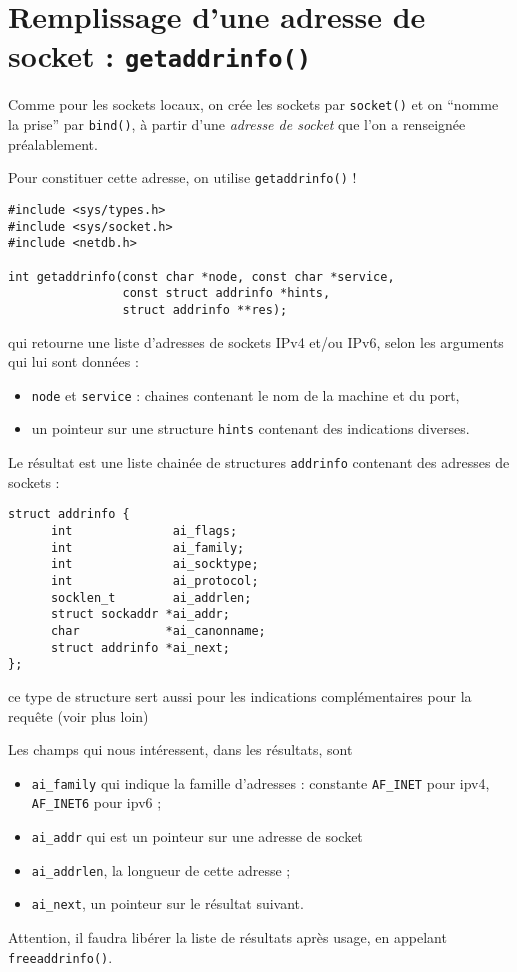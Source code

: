 \section{Remplissage d'une adresse de socket : \texttt{getaddrinfo()}}

Comme pour les sockets locaux, on crée les sockets par \texttt{socket()}
et on  ``nomme la prise'' par \texttt{bind()}, à partir d'une
\emph{adresse de socket} que l'on a renseignée préalablement.

Pour constituer cette adresse, on utilise \texttt{getaddrinfo()} !

\extrait
\begin{lstlisting}
#include <sys/types.h>
#include <sys/socket.h>
#include <netdb.h>

int getaddrinfo(const char *node, const char *service,
                const struct addrinfo *hints,
                struct addrinfo **res);
\end{lstlisting}

qui retourne une liste d'adresses de sockets IPv4 et/ou IPv6, selon
les arguments qui lui sont données :

\begin{itemize}
\item \texttt{node} et \texttt{service} : chaines contenant le
nom de la machine et du port,
\item un pointeur sur une structure \texttt{hints} contenant des
  indications diverses.
\end{itemize}

Le résultat est une liste chainée de structures \texttt{addrinfo}
contenant des adresses de sockets :

\begin{lstlisting}
struct addrinfo {
      int              ai_flags;
      int              ai_family;
      int              ai_socktype;
      int              ai_protocol;
      socklen_t        ai_addrlen;
      struct sockaddr *ai_addr;
      char            *ai_canonname;
      struct addrinfo *ai_next;
};
\end{lstlisting}

ce type de structure sert aussi pour les indications complémentaires
pour la requête (voir plus loin)

Les champs qui nous intéressent, dans les résultats, sont

\begin{itemize}
\item \texttt{ai\_family} qui indique la famille d'adresses : 
constante \texttt{AF\_INET}  pour ipv4, \texttt{AF\_INET6}  pour ipv6 ; 
\item \texttt{ai\_addr}  qui est un pointeur sur une adresse de socket
\item \texttt{ai\_addrlen}, la longueur de cette adresse ;
\item \texttt{ai\_next}, un pointeur sur le résultat suivant.
\end{itemize}
Attention, il faudra libérer la liste de résultats après usage, 
en appelant \texttt{freeaddrinfo()}.

